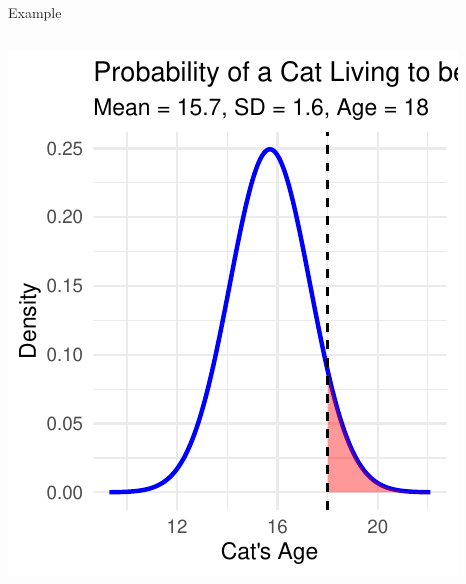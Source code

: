 \documentclass[
  ignorenonframetext,
]{beamer}
\begin{document}
\begin{frame}[fragile]{Example}
\begin{columns}[T]
\begin{column}{0.5\textwidth}
\includegraphics{M5-Hypothesis-Testing,-Probability-and-Distribution_files/figure-beamer/unnamed-chunk-27-1.pdf}
\end{column}
\end{columns}
\end{frame}
\end{document}
